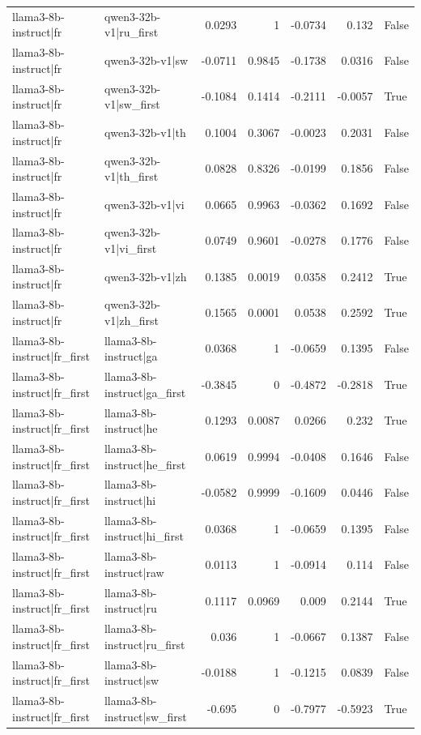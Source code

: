 \begin{table}
\begin{tabular}{l l r r r r l}
llama3-8b-instruct|fr & qwen3-32b-v1|ru_first & 0.0293 & 1 & -0.0734 & 0.132 & False \\
llama3-8b-instruct|fr & qwen3-32b-v1|sw & -0.0711 & 0.9845 & -0.1738 & 0.0316 & False \\
llama3-8b-instruct|fr & qwen3-32b-v1|sw_first & -0.1084 & 0.1414 & -0.2111 & -0.0057 & True \\
llama3-8b-instruct|fr & qwen3-32b-v1|th & 0.1004 & 0.3067 & -0.0023 & 0.2031 & False \\
llama3-8b-instruct|fr & qwen3-32b-v1|th_first & 0.0828 & 0.8326 & -0.0199 & 0.1856 & False \\
llama3-8b-instruct|fr & qwen3-32b-v1|vi & 0.0665 & 0.9963 & -0.0362 & 0.1692 & False \\
llama3-8b-instruct|fr & qwen3-32b-v1|vi_first & 0.0749 & 0.9601 & -0.0278 & 0.1776 & False \\
llama3-8b-instruct|fr & qwen3-32b-v1|zh & 0.1385 & 0.0019 & 0.0358 & 0.2412 & True \\
llama3-8b-instruct|fr & qwen3-32b-v1|zh_first & 0.1565 & 0.0001 & 0.0538 & 0.2592 & True \\
llama3-8b-instruct|fr_first & llama3-8b-instruct|ga & 0.0368 & 1 & -0.0659 & 0.1395 & False \\
llama3-8b-instruct|fr_first & llama3-8b-instruct|ga_first & -0.3845 & 0 & -0.4872 & -0.2818 & True \\
llama3-8b-instruct|fr_first & llama3-8b-instruct|he & 0.1293 & 0.0087 & 0.0266 & 0.232 & True \\
llama3-8b-instruct|fr_first & llama3-8b-instruct|he_first & 0.0619 & 0.9994 & -0.0408 & 0.1646 & False \\
llama3-8b-instruct|fr_first & llama3-8b-instruct|hi & -0.0582 & 0.9999 & -0.1609 & 0.0446 & False \\
llama3-8b-instruct|fr_first & llama3-8b-instruct|hi_first & 0.0368 & 1 & -0.0659 & 0.1395 & False \\
llama3-8b-instruct|fr_first & llama3-8b-instruct|raw & 0.0113 & 1 & -0.0914 & 0.114 & False \\
llama3-8b-instruct|fr_first & llama3-8b-instruct|ru & 0.1117 & 0.0969 & 0.009 & 0.2144 & True \\
llama3-8b-instruct|fr_first & llama3-8b-instruct|ru_first & 0.036 & 1 & -0.0667 & 0.1387 & False \\
llama3-8b-instruct|fr_first & llama3-8b-instruct|sw & -0.0188 & 1 & -0.1215 & 0.0839 & False \\
llama3-8b-instruct|fr_first & llama3-8b-instruct|sw_first & -0.695 & 0 & -0.7977 & -0.5923 & True \\

\end{tabular}
\end{table}
